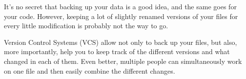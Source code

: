 
It's no secret that backing up your data is a good idea, and the same goes for your code. 
However, keeping a lot of slightly renamed versions of your files for every little modification is probably not the way to go.

Version Control Systems (VCS) allow not only to back up your files, 
but also, more importantly, help you to keep track of the different versions and what changed in each of them. 
Even better, multiple people can simultaneously work on one file and then easily combine the different changes.

